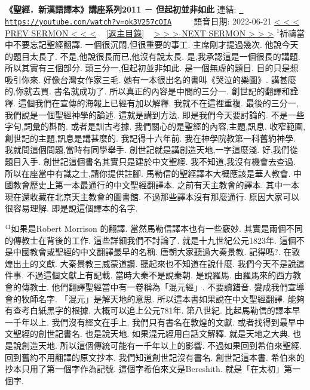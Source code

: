 \documentclass{book}
\begin{document}
\section{}
\label{sec:ok3V257cOIA}
\textbf{《聖經．新漢語譯本》講座系列2011 － 但起初並非如此}
\newline
\newline
連結: \href{https://youtube.com/watch?v=ok3V257cOIA}{\texttt{ https://youtube.com/watch?v=ok3V257cOIA}} ~~~~ 語音日期: 2022-06-21 
\newline
\newline
\hyperref[sec:FbD104WC_Bk]{\small{< < < PREV SERMON < < <}}
~
\hyperref[sec:index]{\small{[返主目錄]}}
~
\hyperref[sec:9gWlq_OvVJU]{\small{> > > NEXT SERMON > > >}}
\newline
\newline
$^{1}$祈禱當中不要忘記聖經翻譯.
一個很沉悶,但很重要的事工.
主席剛才提過幾次.
他說今天的題目太長了.
不是,他說很長而已,他沒有說太長.
是,我承認這是一個很長的講題.
所以其實有三個部分.
頭三分一,但起初並非如此.
是一個無虛的題目.
目的只是想吸引你來.
好像台灣女作家三毛.
她有一本很出名的書叫《哭泣的樂圖》.
講甚麼的,你就去買.
書名就成功了.
所以真正的內容是中間的三分一.
創世記的翻譯和詮釋.
這個我們在宣傳的海報上已經有加以解釋.
我就不在這裡重複.
最後的三分一,我們說是一個聖經神學的論述.
這就是講到方法.
即是我們今天要討論的.
不是一些字句,詞彙的斟酌.
或者是訓古考據.
我們關心的是聖經的內容,主題,訊息.
收窄範圍,創世記的主題,訊息是講甚麼的.
我記得十六年前.
我在神學院教第一科舊約神學.
我就問這個問題,當時有同學舉手.
創世記就是講創造天地,一字這麼淺.
好,我們從題目入手.
創世記這個書名其實只是建於中文聖經.
我不知道,我沒有機會去查過.
所以在座當中有識之士,請你提供註腳.
馬勒信的聖經譯本大概應該是華人教會.
中國教會歷史上第一本最通行的中文聖經翻譯本.
之前有天主教會的譯本.
其中一本現在還收藏在北京天主教會的圖書館.
不過那些譯本沒有那麼通行.
原因大家可以很容易理解.
即是說這個譯本的名字.

$^{41}$如果是Robert Morrison 的翻譯.
當然馬勒信譯本也有一些竅妙.
其實是兩個不同的傳教士在背後的工作.
這些詳細我們不討論了.
就是十九世紀公元1823年.
這個不是中國教會或聖經的中文翻譯最早的名稱.
唐朝大家聽過大秦景教.
記得嗎?.
在敦煌出土的文獻.
大秦景教三威蒙道讚.
聽起來也不知道在說什麼.
我們今天不是說這件事.
不過這個文獻上有記載.
當時大秦不是說秦朝.
是說羅馬.
由羅馬來的西方教會的傳教士.
他們翻譯聖經當中有一卷稱為「混元經」.
不要讀錯音.
變成我們宣導會的牧師名字.
「混元」是解天地的意思.
所以這本書如果說在中文聖經翻譯.
能夠有查考白紙黑字的根據.
大概可以追上公元781年.
第八世紀.
比起馬勒信的譯本早一千年以上.
我們沒有經文在手上.
我們只有書名在敦煌的文獻.
或者找得到最早中文聖經的創世記書名.
也是說天地.
如果混元經用白話文解釋.
就是天地之大典.
也是說創造天地.
所以這個傳統可能有一千年以上的影響.
不過如果回到希伯來聖經.
回到舊約不用翻譯的原文抄本.
我們知道創世記沒有書名.
創世記這本書.
希伯來的抄本只用了第一個字作為記號.
這個字希伯來文是Bereshith.
就是「在太初」第一個字.
\end{document}
